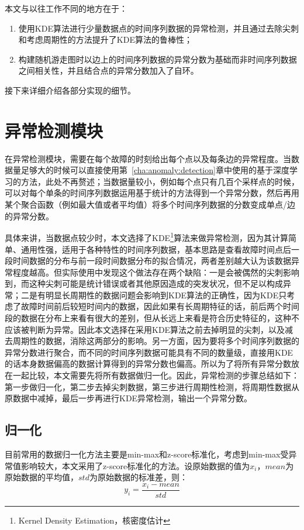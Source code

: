 本文与以往工作不同\cite{lin2016automated,weng2018root,wu2020microrca}的地方在于：

\begin{enumerate}
  \item 使用KDE算法进行少量数据点的时间序列数据的异常检测，并且通过去除尖刺和考虑周期性的方法提升了KDE算法的鲁棒性；
  \item 构建随机游走图时以边上的时间序列数据的异常分数为基础而非时间序列数据之间相关性，并且结合点的异常分数加入了自环。
\end{enumerate}

接下来详细介绍各部分实现的细节。
\section{异常检测模块}
\label{sec:anomaly:detection}
在异常检测模块，需要在每个故障的时刻给出每个点以及每条边的异常程度。当数据量足够大的时候可以直接使用第~\ref{cha:anomaly:detection}章中使用的基于深度学习的方法，此处不再赘述；当数据量较小，例如每个点只有几百个采样点的时候，可以对每个单条的时间序列数据运用基于统计的方法得到一个异常分数，然后再用某个聚合函数（例如最大值或者平均值）将多个时间序列数据的分数变成单点/边的异常分数。

具体来讲，当数据点较少时，本文选择了KDE\footnote{Kernel Density Estimation，核密度估计}算法来做异常检测，因为其计算简单、通用性强，适用于各种特性的时间序列数据，基本思路是查看故障时间点后一段时间数据的分布与前一段时间数据分布的拟合情况，两者差别越大认为该数据异常程度越高。但实际使用中发现这个做法存在两个缺陷：一是会被偶然的尖刺影响到，而这种尖刺可能是统计错误或者其他原因造成的突发状况，但不足以构成异常；二是有明显长周期性的数据问题会影响到KDE算法的正确性，因为KDE只考虑了故障时间前后较短时间内的数据，因此如果有长周期特征的话，前后两个时间段的数据在分布上来看有很大的差别，但从长远上来看是符合历史特征的，这种不应该被判断为异常。因此本文选择在采用KDE算法之前去掉明显的尖刺，以及减去周期性的数据，消除这两部分的影响。另一方面，因为要将多个时间序列数据的异常分数进行聚合，而不同的时间序列数据可能具有不同的数量级，直接用KDE的话本身数据偏高的数据计算得到的异常分数也偏高。所以为了将所有异常分数放在一起比较，本文需要先将所有数据做归一化。因此，异常检测的步骤总结如下：第一步做归一化，第二步去掉尖刺数据，第三步进行周期性检测，将周期性数据从原数据中减掉，最后一步再进行KDE异常检测，输出一个异常分数。
\subsection{归一化}
目前常用的数据归一化方法主要是min-max和z-score标准化，考虑到min-max受异常值影响较大，本文采用了z-score标准化的方法。设原始数据的值为$x_i$，$mean$为原始数据的平均值，$std$为原始数据的标准差，则：
\begin{equation*}
y_i = \frac{x_i-mean}{std}
\end{equation*}

